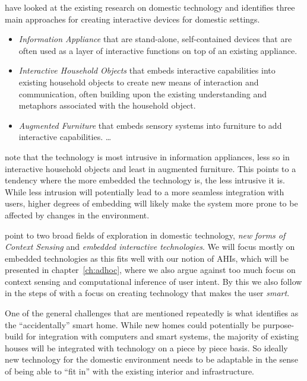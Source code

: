 \citet{rodden2003evolution} have looked at the existing research on domestic technology and identifies three main approaches for creating interactive devices for domestic settings.

\begin{itemize}
  \item{\emph{Information Appliance} that are stand-alone, self-contained devices that are often used as a layer of interactive functions on top of an existing appliance.}
  \item{\emph{Interactive Household Objects} that embeds interactive capabilities into existing household objects to create new means of interaction and communication, often building upon the existing understanding and metaphors associated with the household object.}
  \item{\emph{Augmented Furniture} that embeds sensory systems into furniture to add interactive capabilities. \ldots}
\end{itemize}

\citet{rodden2003evolution} note that the technology is most intrusive in information appliances, less so in interactive household objects and least in augmented furniture.
This points to a tendency where the more embedded the technology is, the less intrusive it is.
While less intrusion will potentially lead to a more seamless integration with users, higher degrees of embedding will likely make the system more prone to be affected by changes in the environment. 

\citeauthor{rodden2003evolution} point to two broad fields of exploration in domestic technology, \emph{new forms of Context Sensing} and \emph{embedded interactive technologies}.
We will focus mostly on embedded technologies as this fits well with our notion of AHIs, which will be presented in chapter~\ref{ch:adhoc}, where we also argue against too much focus on context sensing and computational inference of user intent.
By this we also follow in the steps of \citet{taylor2007homes} with a focus on creating technology that makes the user \emph{smart}.

One of the general challenges that are mentioned repeatedly \citep{edwards2001home,aldrich2003smart,rodden2003evolution,brand1995buildings} is what \citet{edwards2001home} identifies as the ``accidentally'' smart home.
While new homes could potentially be purpose-build for integration with computers and smart systems, the majority of existing houses will be integrated with technology on a piece by piece basis.
So ideally new technology for the domestic environment needs to be adaptable in the sense of being able to ``fit in'' with the existing interior and infrastructure. 

